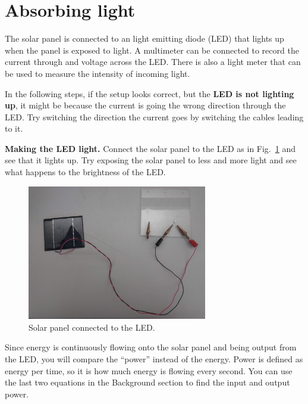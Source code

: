 \section{Absorbing light}

The solar panel is connected to an light emitting diode (LED) that lights up when the panel is exposed to light. A multimeter can be connected to record the current through and voltage across the LED. There is also a light meter that can be used to measure the intensity of incoming light.

\begin{framed}
	In the following steps, if the setup looks correct, but the \textbf{LED is not lighting up}, it might be because the current is going the wrong direction through the LED. Try switching the direction the current goes by switching the cables leading to it.
\end{framed}

\begin{steps}
	\item \textbf{Making the LED light.} Connect the solar panel to the LED as in Fig.\ \ref{et:fig:solar-led} and see that it lights up. Try exposing the solar panel to less and more light and see what happens to the brightness of the LED.

\end{steps}
	
	\begin{figure}
		\centering
		\includegraphics[width=0.7\textwidth]{energy-trans/solar-led}
		\caption{Solar panel connected to the LED.}\label{et:fig:solar-led}
	\end{figure}

Since energy is continuously flowing onto the solar panel and being output from the LED, you will compare the ``power'' instead of the energy. Power is defined as energy per time, so it is how much energy is flowing every second. You can use the last two equations in the Background section to find the input and output power.

